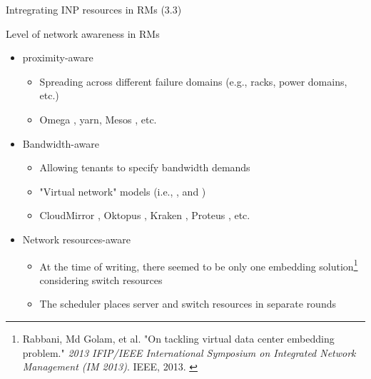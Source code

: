 \begin{frame}{Intregrating INP resources in RMs}
(3.3)
\end{frame}

\begin{frame}{Level of network awareness in RMs}
    \vspace{2mm}
    \begin{itemize}
        \item {} proximity-aware
        \begin{itemize}
            \item Spreading  across different failure domains (e.g., racks, power domains, etc.)
            \item Omega \cite{omega}, \glsdesc{yarn}, Mesos \cite{mesos}, etc.
        \end{itemize}
        \item Bandwidth-aware
        \begin{itemize}
            \item Allowing tenants to specify bandwidth demands
            \item "Virtual network" models (i.e., ,  and )
            \item CloudMirror \cite{cloudmirror}, Oktopus \cite{oktopus}, Kraken \cite{kraken}, Proteus \cite{proteus}, etc.
        \end{itemize}
        \item Network resources-aware
        \begin{itemize}
            \item At the time of writing, there seemed to be only one embedding solution\footnote{\tiny{Rabbani, Md Golam, et al. "On tackling virtual data center embedding problem." \textit{2013 IFIP/IEEE International Symposium on Integrated Network Management (IM 2013)}. IEEE, 2013. \cite{ontackling}}} considering switch resources
            \item The scheduler places server and switch resources in separate rounds
        \end{itemize}
    \end{itemize}
    \vspace{5mm}
\end{frame}

